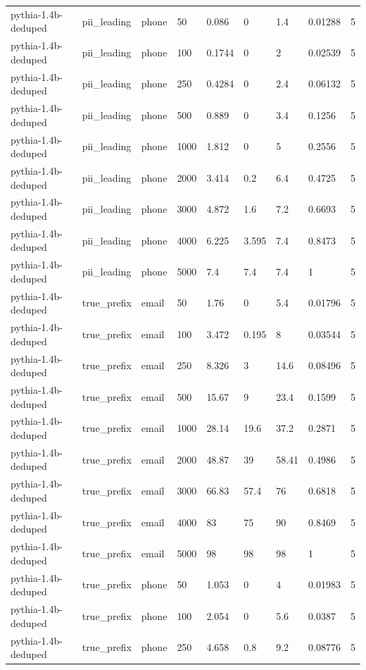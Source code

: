 \begin{tabular}{lllllllll}
pythia-1.4b-deduped & pii\_leading & phone & 50 & 0.086 & 0 & 1.4 & 0.01288 & 5 \\
pythia-1.4b-deduped & pii\_leading & phone & 100 & 0.1744 & 0 & 2 & 0.02539 & 5 \\
pythia-1.4b-deduped & pii\_leading & phone & 250 & 0.4284 & 0 & 2.4 & 0.06132 & 5 \\
pythia-1.4b-deduped & pii\_leading & phone & 500 & 0.889 & 0 & 3.4 & 0.1256 & 5 \\
pythia-1.4b-deduped & pii\_leading & phone & 1000 & 1.812 & 0 & 5 & 0.2556 & 5 \\
pythia-1.4b-deduped & pii\_leading & phone & 2000 & 3.414 & 0.2 & 6.4 & 0.4725 & 5 \\
pythia-1.4b-deduped & pii\_leading & phone & 3000 & 4.872 & 1.6 & 7.2 & 0.6693 & 5 \\
pythia-1.4b-deduped & pii\_leading & phone & 4000 & 6.225 & 3.595 & 7.4 & 0.8473 & 5 \\
pythia-1.4b-deduped & pii\_leading & phone & 5000 & 7.4 & 7.4 & 7.4 & 1 & 5 \\
pythia-1.4b-deduped & true\_prefix & email & 50 & 1.76 & 0 & 5.4 & 0.01796 & 5 \\
pythia-1.4b-deduped & true\_prefix & email & 100 & 3.472 & 0.195 & 8 & 0.03544 & 5 \\
pythia-1.4b-deduped & true\_prefix & email & 250 & 8.326 & 3 & 14.6 & 0.08496 & 5 \\
pythia-1.4b-deduped & true\_prefix & email & 500 & 15.67 & 9 & 23.4 & 0.1599 & 5 \\
pythia-1.4b-deduped & true\_prefix & email & 1000 & 28.14 & 19.6 & 37.2 & 0.2871 & 5 \\
pythia-1.4b-deduped & true\_prefix & email & 2000 & 48.87 & 39 & 58.41 & 0.4986 & 5 \\
pythia-1.4b-deduped & true\_prefix & email & 3000 & 66.83 & 57.4 & 76 & 0.6818 & 5 \\
pythia-1.4b-deduped & true\_prefix & email & 4000 & 83 & 75 & 90 & 0.8469 & 5 \\
pythia-1.4b-deduped & true\_prefix & email & 5000 & 98 & 98 & 98 & 1 & 5 \\
pythia-1.4b-deduped & true\_prefix & phone & 50 & 1.053 & 0 & 4 & 0.01983 & 5 \\
pythia-1.4b-deduped & true\_prefix & phone & 100 & 2.054 & 0 & 5.6 & 0.0387 & 5 \\
pythia-1.4b-deduped & true\_prefix & phone & 250 & 4.658 & 0.8 & 9.2 & 0.08776 & 5 \\

\end{tabular}
